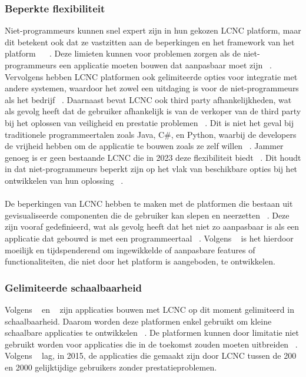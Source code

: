 \subsubsection{Beperkte flexibiliteit}
\label{subsec:beperkte-flexibiliteit}
Niet-programmeurs kunnen snel expert zijn in hun gekozen LCNC platform, maar dit betekent ook dat ze vastzitten aan de beperkingen en het framework van het platform 
~\autocite{Sufi_2023} ~\autocite{Talesra_2021}. 
Deze limieten kunnen voor problemen zorgen als de niet-programmeurs een applicatie moeten bouwen dat aanpasbaar moet zijn ~\autocite{Talesra_2021}. 
Vervolgens hebben LCNC platformen ook gelimiteerde opties voor integratie met andere systemen, waardoor het zowel een uitdaging is voor de niet-programmeurs als 
het bedrijf ~\autocite{Talesra_2021}. Daarnaast bevat LCNC ook third party afhankelijkheden, wat als gevolg heeft dat de gebruiker afhankelijk is van de verkoper van de 
third party bij het oplossen van veiligheid en prestatie problemen ~\autocite{Talesra_2021}. Dit is niet het geval bij traditionele programmeertalen zoals Java, C\#, en Python, 
waarbij de developers de vrijheid hebben om de applicatie te bouwen zoals ze zelf willen ~\autocite{Sufi_2023}. Jammer genoeg is er geen bestaande LCNC die in 2023 deze 
flexibiliteit biedt ~\autocite{Sufi_2023}. Dit houdt in dat niet-programmeurs beperkt zijn op het vlak van beschikbare opties bij het ontwikkelen van hun oplossing ~\autocite{Sufi_2023}. 
\\
\\
De beperkingen van LCNC hebben te maken met de platformen die bestaan uit gevisualiseerde componenten die de gebruiker kan slepen en
 neerzetten ~\autocite{Yan2021}. Deze zijn vooraf gedefinieerd, wat als gevolg heeft dat het niet zo aanpasbaar is als een applicatie 
 dat gebouwd is met een programmeertaal ~\autocite{Yan2021}. Volgens ~\textcite{Yan2021} 
is het hierdoor moeilijk en tijdspenderend om ingewikkelde of aanpasbare features of functionaliteiten, die niet door het platform is aangeboden, te ontwikkelen.
\subsubsection*{Gelimiteerde schaalbaarheid}
\label{subsec:gelimiteerde-schaalbaarheid}
Volgens ~\textcite{Elshan2023} en ~\textcite{Sufi_2023} zijn applicaties bouwen met LCNC op dit moment gelimiteerd in schaalbaarheid. Daarom worden deze platformen enkel gebruikt om kleine schaalbare applicaties te ontwikkelen ~\autocite{Sufi_2023}. 
De platformen kunnen door limitatie niet gebruikt worden voor applicaties die in de toekomst zouden moeten uitbreiden ~\autocite{Elshan2023}. 
Volgens ~\textcite{Yan2021} lag, in 2015, de applicaties die gemaakt zijn door LCNC tussen de 200 en 2000 gelijktijdige gebruikers zonder prestatieproblemen.

